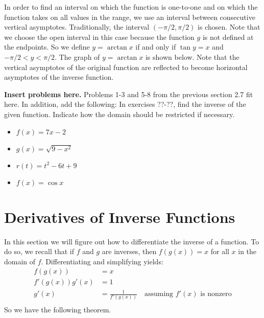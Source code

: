 \documentclass[12pt]{report}
\begin{document}
In order to find an interval on which the function is one-to-one and on which the function takes on all values in the range, we use an interval between consecutive vertical asymptotes. Traditionally, the interval $(-\pi/2,\pi/2)$ is chosen. Note that we choose the open interval in this case because the function $g$ is not defined at the endpoints. So we define $y=\arctan x$ if and only if $\tan y=x$ and $-\pi/2< y<\pi/2$. The graph of $y=\arctan x$ is shown below. Note that the vertical asymptotes of the original function are reflected to become horizontal asymptotes of the inverse function.

\begin{center}
\end{center}

{\bfseries Insert problems here.} Problems 1-3 and 5-8 from the previous section 2.7 fit here. In addition, add the following:
In exercises ??-??, find the inverse of the given function. Indicate how the domain should be restricted if necessary.
\begin{itemize}
\item $f(x)=7x-2$
\item $g(x)=\sqrt{9-x^2}$
\item $r(t)=t^2-6t+9$
\item $f(x)=\cos x$
\end{itemize}

\section{Derivatives of Inverse Functions}

In this section we will figure out how to differentiate the inverse of a function. To do so, we recall that if $f$ and $g$ are inverses, then $f(g(x))=x$ for all $x$ in the domain of $f$. Differentiating and simplifying yields:
\begin{equation*}
\begin{split}
f(g(x))&=x\\
f'(g(x))g'(x)&=1\\
g'(x)&=\frac 1{f'(g(x))} \quad\text{assuming $f'(x)$ is nonzero}\\
\end{split}
\end{equation*}
So we have the following theorem.
\end{document}

